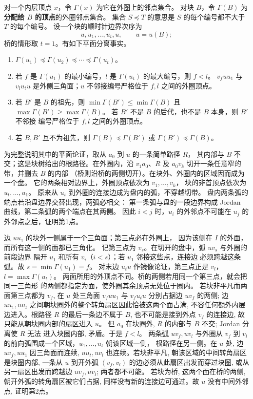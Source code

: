 \begin{solution}
对一个内层顶点 $x$，令 $\Gamma(x)$ 为它在外圈上的邻点集合。
对块 $B$，令 $\Gamma(B)$ 为\textbf{分配给 $B$ 的顶点}的外圈邻点集合。
集合 $S\preceq T$ 的意思是 $S$ 的每个编号都不大于 $T$ 的每个编号。
设一个块的顺时针边界次序为
\[
 u,u_1,\ldots,u_t,u,\qquad u=u(B);
\]
桥的情形取 $t=1$。有如下平面分离事实。
\begin{enumerate}
\item $\Gamma(u_1)\preceq\Gamma(u_2)\preceq\cdots\preceq\Gamma(u_t)$。
\item 若 $f$ 是 $\Gamma(u_1)$ 的最小编号，$l$ 是
  $\Gamma(u_t)$ 的最大编号，则 $f<l$。
  $v_fuu_1$ 与 $v_lu_tu$ 是外侧三角面；$u$ 不邻接编号严格位于
  $f,l$ 之间的外圈顶点。
\item 若 $B'$ 是 $B$ 的祖先，则
  $\min\Gamma(B')\leq \min\Gamma(B)$ 且
  $\max\Gamma(B')\geq \max\Gamma(B)$。
  若 $B'$ 不是 $B$ 的后代，也不是 $B$ 本身，则 $B'$ 不邻接
  编号严格位于 $f,l$ 之间的外圈顶点。
\item 若 $B,B'$ 互不为祖先，则
  $\Gamma(B)\preceq\Gamma(B')$ 或
  $\Gamma(B')\preceq\Gamma(B)$。
\end{enumerate}

为完整说明其中的平面论证，取从 $a_0$ 到 $u$ 的一条简单路径 $R$，
其内部与 $B$ 不交；这是块树给出的根路径。在外圈内，沿
$v_1a_0$、$R$ 及 $a_0v_k$ 切开一条任意窄的带，并删去 $B$ 的内部
（桥则沿桥的两侧切开）。在块外、外圈内的区域因而成为一个盘。
它的两条相对边界上，外圈顶点依次为 $v_1,\ldots,v_k$，
块的非首顶点依次为 $u_t,\ldots,u_1$。
原来从 $u_i$ 到外圈的连接边成为盘内的弧，不穿越切带。
盘内两条弧的端点若沿盘边界交替出现，两弧必相交：
第一条弧与盘的一段边界构成 Jordan 曲线，第二条弧的两个端点在其两侧。
因此 $i<j$ 时，$u_i$ 的外邻点不可能在 $u_j$ 的外邻点之后，证明第1点。

边 $uu_1$ 的块外一侧属于一个三角面；第三点必在外圈上，
因为该侧在 $I$ 的外面，而所有这一侧的面都已三角化。
记第三点为 $v_s$。在切开的盘中，弧 $uv_s$ 与外圈的前段边界
隔开 $u_1$ 和所有 $v_i$（$i<s$）；若 $u_1$ 邻接这些点，连接边
必须跨越这条弧。故 $s=\min\Gamma(u_1)=f$。
对末边 $u_tu$ 作镜像论证，第三点正是
$v_l$，$l=\max\Gamma(u_t)$。
两面所用的外顶点不同。桥的两侧若用同一个第三点，就会把同一三角形
的两侧都指定为面，使外圈其余顶点无处位于圈内。
若块非平凡而两面第三点都为 $v_f$, 在 $u$ 处三角面
$v_fuu_1$ 与 $v_fu_tu$ 分别占据边 $uv_f$ 的两侧;
边 $uu_1,uu_t$ 之间朝块圈外的整个转角扇区因此恰被这两个面占满,
不容任何额外内层边进入。根路径 $R$ 的最后一条边不属于 $B$,
也不可能是接到外点 $v_f$ 的连接边, 故只能从朝块圈内部的扇区进入 $u$。
但 $a_0$ 在块圈外, $R$ 的内部与 $B$ 不交; Jordan 分离使 $R$ 无法
进入块圈内部, 矛盾。于是 $f<l$。
两条弧 $uv_f,uv_l$ 与外圈从 $v_f$
到 $v_l$ 的前向弧围成一个区域，$u_1,\ldots,u_t$ 朝该区域一侧，
根路径在另一侧。在 $u$ 处, 边 $uv_f,uu_1$ 因三角面而连续,
$uu_t,uv_l$ 也连续。若块非平凡, 朝该区域的中间转角扇区是块圈内部,
一条从 $u$ 到开外弧 $(v_f,v_l)$ 的边必须从此扇区出发而穿过块圈,
或从另一扇区出发而跨越边 $uv_f,uv_l$; 两者都不可能。
若块为桥, 这两个面在桥的两侧, 朝开外弧的转角扇区被它们占据,
同样没有新的连接边可通过。故 $u$ 没有中间外邻点, 证明第2点。


\end{solution}
